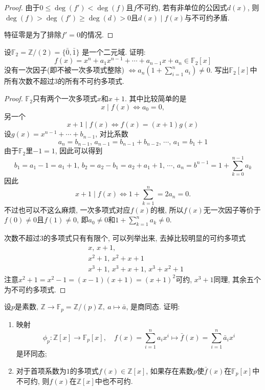 \documentclass{../solutions-cn}
\begin{document}
\begin{proof}
    由于$0 \leqslant \deg(f') < \deg(f)$且$f$不可约, 若有非单位的公因式$d(x)$, 则$\deg(f) > \deg(f') \geqslant \deg(d) > 0$且$d(x) \mid f(x)$与不可约矛盾.

    特征零是为了排除$f' = 0$的情况.
\end{proof}

\begin{exercise}[习题2.3.5]
    设$\mathbb{F}_2 = \mathbb{Z}/(2) = \{\bar{0}, \bar{1}\}$
是一个二元域. 证明: 
\[
    f(x) = x^n + a_1x^{n - 1} + \cdots + a_{n - 1}x + a_n \in \mathbb{F}_2[x]
\]
没有一次因子(即不被一次多项式整除)
\(
    \Leftrightarrow a_n\left(1 + \sum_{i = 1}^n a_i\right) \neq 0.
\)
写出$\mathbb{F}_2[x]$中所有次数不超过$3$的所有不可约多项式.
\end{exercise}

\begin{proof}
    $\mathbb{F}_2$只有两个一次多项式$x$和$x + 1$. 其中比较简单的是
    \[
        x \mid f(x) \iff a_0 = 0,
    \]
    另一个
    \[
        x + 1 \mid f(x) \iff f(x) = (x + 1)g(x)
    \]
    设$g(x) = x^{n - 1} + \cdots + b_{n - 1}$, 对比系数
    \[
        a_n = b_{n - 1},\, a_{n - 1} = b_{n - 1} + b_{n - 2},\, \cdots,\, a_{1} = b_1 + 1
    \]
    由于$\mathbb{F}_2$里$-1 = 1$, 因此可以得到
    \[
        b_1 = a_1 - 1 = a_1 + 1,\, b_2 = a_2 - b_1 = a_2 + a_1 + 1,\, \cdots,\, a_n = b^{n - 1} = 1 + \sum_{k = 0}^{n - 1} a_k
    \]
    因此
    \[
        x + 1 \mid f(x) \iff 1 + \sum_{k = 1}^{n} = 2a_n = 0.
    \]
    不过也可以不这么麻烦, 一次多项式对应$f(x)$的根, 所以$f(x)$无一次因子等价于$f(0) \neq 0$且$f(1) \neq 0$, 即$a_0 \neq 0$和$1 + \sum_{k = 1}^{n} a_k \neq 0$.

    次数不超过$3$的多项式只有有限个, 可以列举出来, 去掉比较明显的可约多项式
    \[
    \begin{aligned}
        &x,\, x + 1,\\
        &x^2 + 1,\, x^2 + x + 1\\
        &x^3 + 1,\, x^3 + x + 1,\, x^3 + x^2 + 1
    \end{aligned}
    \]
    注意$x^2 + 1 = x^2 - 1 = (x - 1)(x + 1) = (x + 1)^2$可约, $x^3 + 1$同理, 其余五个为不可约多项式.
\end{proof}

\begin{exercise}[习题2.3.6]
    设$p$是素数, $\mathbb{Z} \to \mathbb{F}_p = \mathbb{Z}/(p)\mathbb{Z},~a \mapsto \bar{a}$,
是商同态. 证明: 
\begin{enumerate}[(1)]
    \item 映射
\[
    \phi_p:\mathbb{Z}[x] \to \mathbb{F}_p[x],\quad f(x) = \sum_{i = 1}^n a_ix^i \mapsto \bar{f}(x) = \sum_{i = 1}^n \bar{a}_ix^i
\]
是环同态;
    \item 对于首项系数为$1$的多项式$f(x) \in \mathbb{Z}[x]$,
如果存在素数$p$使$\bar{f}(x)$在$\mathbb{F}_p[x]$中不可约, 
则$f(x)$在$\mathbb{Z}[x]$中也不可约.
\end{enumerate}
\end{exercise}
\end{document}
